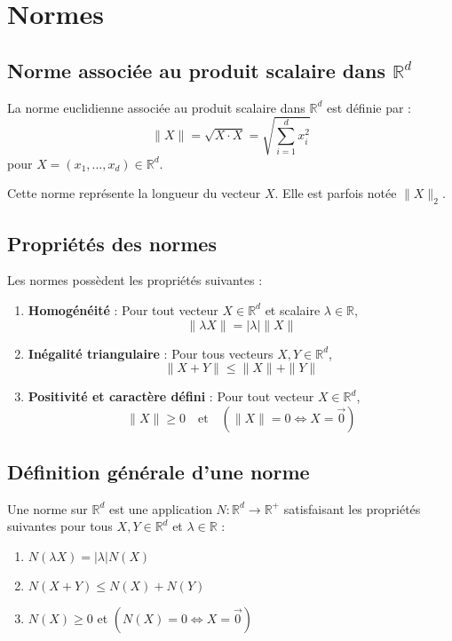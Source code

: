 \documentclass[oneside]{book}
\begin{document}
\section{Normes}

\subsection{Norme associée au produit scalaire dans $\mathbb{R}^d$}

\begin{definition}
La norme euclidienne associée au produit scalaire dans $\mathbb{R}^d$ est définie par :
\[
\|X\| = \sqrt{X \cdot X} = \sqrt{\sum_{i=1}^d x_i^2}
\]
pour $X = (x_1, \ldots, x_d) \in \mathbb{R}^d$.
\end{definition}
Cette norme représente la longueur du vecteur $X$. Elle est parfois notée $\|X\|_2$.

\subsection{Propriétés des normes}

Les normes possèdent les propriétés suivantes :

\begin{enumerate}
    \item \textbf{Homogénéité} : Pour tout vecteur $X \in \mathbb{R}^d$ et scalaire $\lambda \in \mathbb{R}$,
    \[
    \|\lambda X\| = |\lambda| \|X\|
    \]
    \item \textbf{Inégalité triangulaire} : Pour tous vecteurs $X, Y \in \mathbb{R}^d$,
    \[
    \|X + Y\| \leq \|X\| + \|Y\|
    \]
    \item \textbf{Positivité et caractère défini} : Pour tout vecteur $X \in \mathbb{R}^d$,
    \[
    \|X\| \geq 0 \quad \text{et} \quad (\|X\| = 0 \iff X = \overrightarrow{0})
    \]
\end{enumerate}

\subsection{Définition générale d'une norme}

\begin{definition}
Une norme sur $\mathbb{R}^d$ est une application $N : \mathbb{R}^d \to \mathbb{R}^+$ satisfaisant les propriétés suivantes pour tous $X, Y \in \mathbb{R}^d$ et $\lambda \in \mathbb{R}$ :
\begin{enumerate}
    \item $N(\lambda X) = |\lambda| N(X)$
    \item $N(X + Y) \leq N(X) + N(Y)$
    \item $N(X) \geq 0$ et $(N(X) = 0 \iff X = \overrightarrow{0})$
\end{enumerate}
\end{definition}
\end{document}

